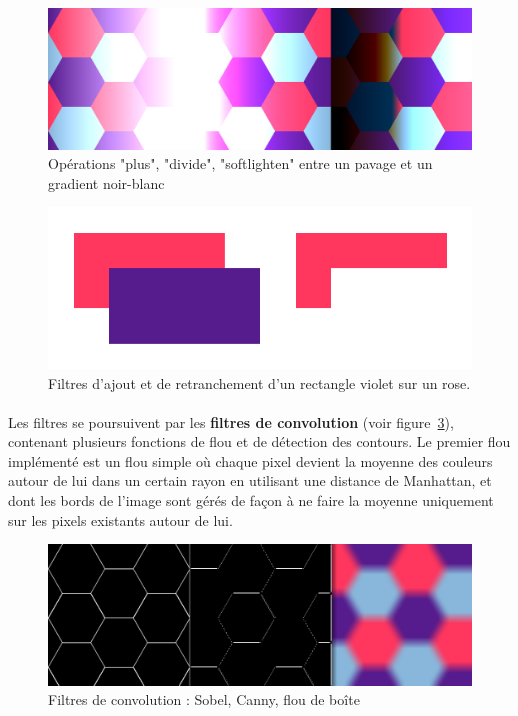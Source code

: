 \documentclass[a4paper]{article}
\begin{document}
\begin{figure}
    \centering
    \includegraphics[width=0.8\columnwidth]{compose.png}
    \caption{Opérations "plus", "divide", "softlighten" entre un pavage et un gradient noir-blanc}
    \label{fig:compose}
\end{figure}

\begin{figure}
    \centering
    \includegraphics[width=0.8\columnwidth]{layers.png}
    \caption{Filtres d'ajout et de retranchement d'un rectangle violet sur un rose.}
    \label{fig:layers}
\end{figure}

\paragraph{}
Les filtres se poursuivent par les \textbf{filtres de convolution} (voir figure~\ref{fig:convolution}), contenant plusieurs fonctions de flou et de détection des contours. Le premier flou implémenté est un flou simple où chaque pixel devient la moyenne des couleurs autour de lui dans un certain rayon en utilisant une distance de Manhattan, et dont les bords de l'image sont gérés de façon à ne faire la moyenne uniquement sur les pixels existants autour de lui. 

\begin{figure}
    \centering
    \includegraphics[width=0.8\columnwidth]{convo.png}
    \caption{Filtres de convolution : Sobel, Canny, flou de boîte}
    \label{fig:convolution}
\end{figure}
\end{document}
